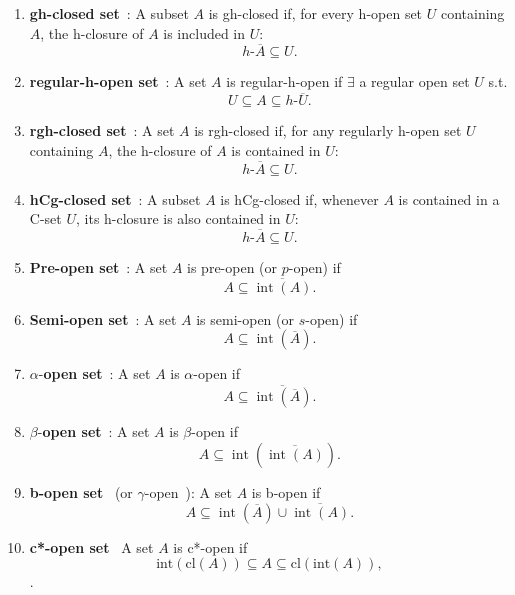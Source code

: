 \documentclass[12pt,a4paper,twoside]{report}  %
\theoremstyle{plain}
\theoremstyle{definition}
\begin{document}
\begin{enumerate}[label=(\roman*)]
\item \textbf{gh-closed set}~\cite{rodrigo2012international}:  
A subset \(A\) is gh-closed if, for every h-open set \(U\) containing \(A\), the h-closure of \(A\) is included in \(U\):
\[
h\text{-}\overline{A} \subseteq U.
\]

\item \textbf{regular-h-open set}~\cite{rodrigo2012international}:  
A set \(A\) is regular-h-open if $\exists$ a regular open set \(U\) s.t.
\[
U \subseteq A \subseteq h\text{-}\overline{U}.
\]

\item \textbf{rgh-closed set}~\cite{rodrigo2012international}:  
A set \(A\) is rgh-closed if, for any regularly h-open set \(U\) containing \(A\), the h-closure of \(A\) is contained in \(U\):
\[
h\text{-}\overline{A} \subseteq U.
\]

\item \textbf{hCg-closed set}~\cite{rodrigo2012international}:  
A subset \(A\) is hCg-closed if, whenever \(A\) is contained in a C-set \(U\), its h-closure is also contained in \(U\):
\[
h\text{-}\overline{A} \subseteq U.
\]

\item \textbf{Pre-open set}~\cite{mashhour1982precontinuous}:  
A set \(A\) is pre-open (or \(p\)-open) if
\[
A \subseteq \overline{\operatorname{int}(A)}.
\]

\item \textbf{Semi-open set}~\cite{levine1963semi}:  
A set \(A\) is semi-open (or \(s\)-open) if
\[
A \subseteq \operatorname{int}(\overline{A}).
\]

\item \(\alpha\)-\textbf{open set}~\cite{njȧstad1965some}:  
A set \(A\) is \(\alpha\)-open if
\[
A \subseteq \overline{\operatorname{int}(\overline{A})}.
\]

\item \(\beta\)-\textbf{open set}~\cite{me1983beta}:  
A set \(A\) is \(\beta\)-open if
\[
A \subseteq \operatorname{int}(\overline{\operatorname{int}(A)}).
\]

\item \textbf{b-open set}~\cite{andrijevic1996b} (or \(\gamma\)-open~\cite{el1997study}):  
A set \(A\) is b-open if
\[
A \subseteq \operatorname{int}(\overline{A}) \cup \overline{\operatorname{int}(A)}.
\]

\item \textbf{c*-open set}~\cite{malathi2017pre} A set \(A\) is c*-open if \[
\mathrm{int}(\mathrm{cl}(A)) \subseteq A \subseteq \mathrm{cl}(\mathrm{int}(A)),
\].
\end{enumerate}
\end{document}
